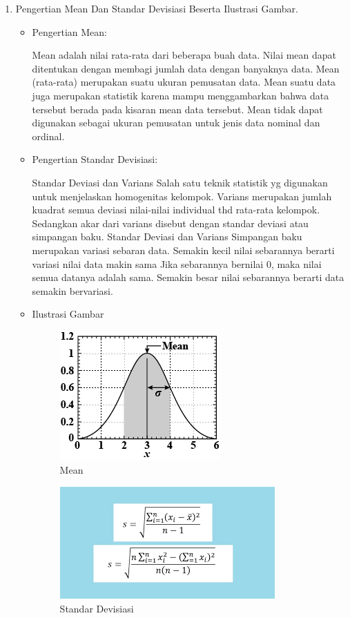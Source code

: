 \begin{enumerate}
\begin{itemize}
\end{itemize}

\item Pengertian Mean Dan Standar Devisiasi Beserta Ilustrasi Gambar.
\begin{itemize}
\item  Pengertian Mean:

Mean adalah nilai rata-rata dari beberapa buah data. Nilai mean dapat ditentukan dengan membagi jumlah data dengan banyaknya data. Mean (rata-rata) merupakan suatu ukuran pemusatan data. Mean suatu data juga merupakan statistik karena mampu menggambarkan bahwa data tersebut berada pada kisaran mean data tersebut. Mean tidak dapat digunakan sebagai ukuran pemusatan untuk jenis data nominal dan ordinal.

\item  Pengertian Standar Devisiasi:

Standar Deviasi dan Varians Salah satu teknik statistik yg digunakan untuk menjelaskan homogenitas kelompok. Varians merupakan jumlah kuadrat semua deviasi nilai-nilai individual thd rata-rata kelompok. Sedangkan akar dari varians disebut dengan standar deviasi atau simpangan baku. Standar Deviasi dan Varians Simpangan baku merupakan variasi sebaran data. Semakin kecil nilai sebarannya berarti variasi nilai data makin sama Jika sebarannya bernilai 0, maka nilai semua datanya adalah sama. Semakin besar nilai sebarannya berarti data semakin bervariasi.

\item Ilustrasi Gambar

\begin{figure}[!hbtp]
\centering
\includegraphics[scale=0.7]{figures/1174031/5/2.png}
\caption{Mean}
\label{Mean}
\end{figure}

\begin{figure}[!hbtp]
\centering
\includegraphics[scale=0.7]{figures/1174031/5/3.png}
\caption{Standar Devisiasi}
\label{Standar Devisiasi}
\end{figure}


\end{itemize}
\end{enumerate}

